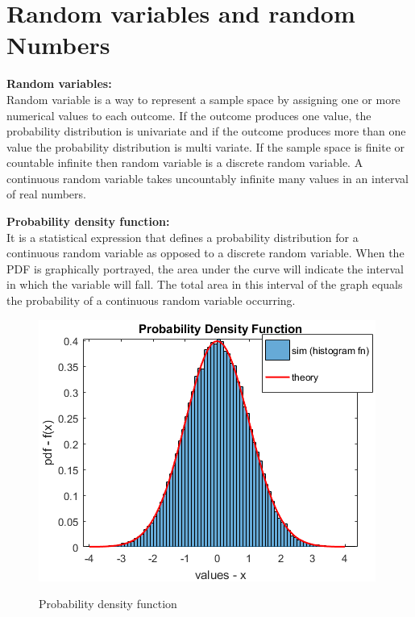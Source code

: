  \chapter{Random variables and random Numbers}
\noindent \textbf{Random variables:}\\
\noindent Random variable is a way to represent a sample space by assigning one or more numerical values to each outcome. If the outcome produces one value, the probability distribution is univariate and if the outcome produces more than one value the probability distribution is multi variate. If the sample space is finite or countable infinite then random variable is a discrete random variable. A continuous random variable takes uncountably infinite many values in an interval of real numbers.

\noindent \textbf{Probability density function:}\\
\noindent It is a statistical expression that defines a probability distribution for a continuous random variable as opposed to a discrete random variable. When the PDF is graphically portrayed, the area under the curve will indicate the interval in which the variable will fall. The total area in this interval of the graph equals the probability of a continuous random variable occurring.
\begin{figure}[H]
\begin{center}
\includegraphics[scale=0.55]{fig12.png}\\
\caption{Probability density function}
\label{Probability density function}
\end{center}
\end{figure}

